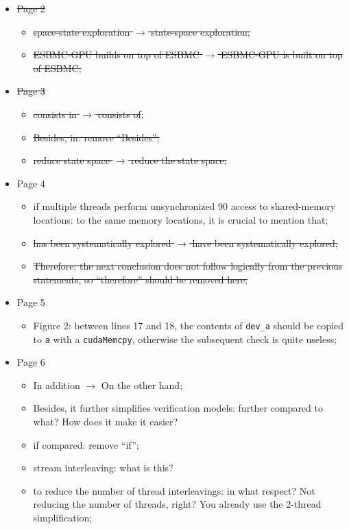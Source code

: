 \documentclass[12pt]{article}
\begin{document}
\begin{itemize}
\item \sout{Page 2}
  \begin{itemize}
  \item \sout{space-state exploration $\rightarrow$ state-space exploration;}
  \item \sout{ESBMC-GPU builds on top of ESBMC $\rightarrow$ ESBMC-GPU is built on top of ESBMC;}
  \end{itemize}
\item \sout{Page 3}
  \begin{itemize}
  \item \sout{consists in $\rightarrow$ consists of};
  \item \sout{Besides, in: remove ``Besides'';}
  \item \sout{reduce state space $\rightarrow$ reduce the state space;}
  \end{itemize}
\item Page 4
  \begin{itemize}
  \item if multiple threads perform unsynchronized 90 access to shared-memory locations: to the same memory locations, it is crucial to mention that;
  \item \sout{has been systematically explored $\rightarrow$ have been systematically explored;}
  \item \sout{Therefore: the next conclusion does not follow logically from the previous statements, so ``therefore'' should be removed here;}
  \end{itemize}
\item Page 5
  \begin{itemize}
  \item Figure 2: between lines 17 and 18, the contents of {\tt dev\_a} should be copied to {\tt a} with a {\tt cudaMemcpy}, otherwise the subsequent check is quite useless;
  \end{itemize}
\item Page 6
  \begin{itemize}
  \item In addition $\rightarrow$ On the other hand;
  \item Besides, it further simplifies verification models: further compared to what? How does it make it easier?
  \item if compared: remove ``if'';
  \item stream interleaving: what is this?
  \item  to reduce the number of thread interleavings: in what respect? Not reducing the number of threads, right? You already use the 2-thread simplification;
  \end{itemize}
\end{itemize}
\end{document}
